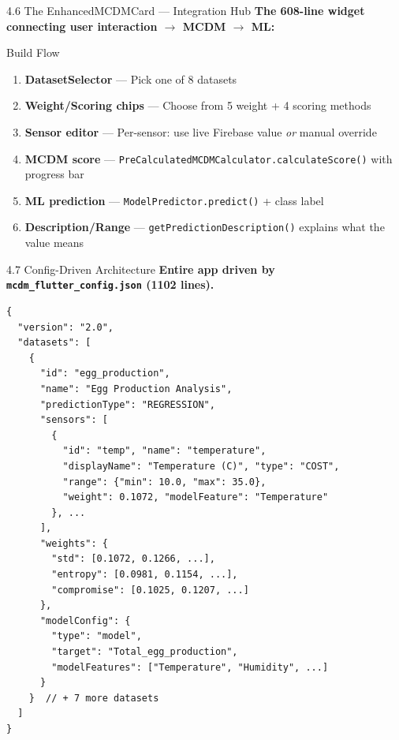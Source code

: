 \documentclass[aspectratio=169]{beamer}
\begin{document}
\begin{frame}[allowframebreaks]{4.6 The EnhancedMCDMCard --- Integration Hub}
  \textbf{The 608-line widget connecting user interaction $\rightarrow$ MCDM $\rightarrow$ ML:}

  \vspace{0.2cm}
  \begin{block}{Build Flow}
    \begin{enumerate}
      \item \textbf{DatasetSelector} --- Pick one of 8 datasets
      \item \textbf{Weight/Scoring chips} --- Choose from 5 weight + 4 scoring methods
      \item \textbf{Sensor editor} --- Per-sensor: use live Firebase value \textit{or} manual override
      \item \textbf{MCDM score} --- \texttt{PreCalculatedMCDMCalculator.calculateScore()} with progress bar
      \item \textbf{ML prediction} --- \texttt{ModelPredictor.predict()} + class label
      \item \textbf{Description/Range} --- \texttt{getPredictionDescription()} explains what the value means
    \end{enumerate}
  \end{block}
\end{frame}

\begin{frame}{4.7 Config-Driven Architecture}
  \textbf{Entire app driven by \texttt{mcdm\_flutter\_config.json} (1102 lines).}

  \vspace{0.1cm}
  \begin{lstlisting}[style=jsonstyle,basicstyle=\ttfamily\footnotesize]
{
  "version": "2.0",
  "datasets": [
    {
      "id": "egg_production",
      "name": "Egg Production Analysis",
      "predictionType": "REGRESSION",
      "sensors": [
        {
          "id": "temp", "name": "temperature",
          "displayName": "Temperature (C)", "type": "COST",
          "range": {"min": 10.0, "max": 35.0},
          "weight": 0.1072, "modelFeature": "Temperature"
        }, ...
      ],
      "weights": {
        "std": [0.1072, 0.1266, ...],
        "entropy": [0.0981, 0.1154, ...],
        "compromise": [0.1025, 0.1207, ...]
      },
      "modelConfig": {
        "type": "model",
        "target": "Total_egg_production",
        "modelFeatures": ["Temperature", "Humidity", ...]
      }
    }  // + 7 more datasets
  ]
}
  \end{lstlisting}
\end{frame}
\end{document}

